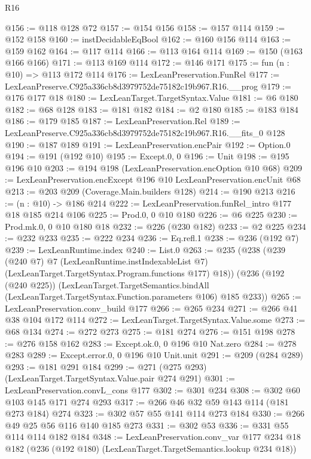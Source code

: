 \begin{lexlean}{R16}
\begin{coremodule}
@156 := @118 @128 @72
@157 := @154 @156
@158 := @157 @114
@159 := @152 @158
@160 := instDecidableEqBool
@162 := @160 @156 @114
@163 := @159 @162
@164 := @117 @114
@166 := @113 @164 @114
@169 := @150 (@163 @166 @166)
@171 := @113 @169 @114
@172 := @146 @171
@175 := fun (n : @10) => @113 @172 @114
@176 := LexLeanPreservation.FunRel
@177 := LexLeanPreserve.C925a336cb8d3979752de75182c19b967.R16.__prog
@179 := @176 @177 @18
@180 := LexLeanTarget.TargetSyntax.Value
@181 := @6 @180
@182 := @68 @128
@183 := @181 @182
@184 := @2 @180
@185 := @183 @184
@186 := @179 @185
@187 := LexLeanPreservation.Rel
@189 := LexLeanPreserve.C925a336cb8d3979752de75182c19b967.R16.__fits_0 @128
@190 := @187 @189
@191 := LexLeanPreservation.encPair
@192 := Option.{0}
@194 := @191 (@192 @10)
@195 := Except.{0, 0}
@196 := Unit
@198 := @195 @196 @10
@203 := @194 @198 (LexLeanPreservation.encOption @10 @68)
@209 := LexLeanPreservation.encExcept @196 @10 LexLeanPreservation.encUnit @68
@213 := @203 @209 (Coverage.Main.builders @128)
@214 := @190 @213
@216 := (n : @10) -> @186 @214
@222 := LexLeanPreservation.funRel_intro @177 @18 @185 @214 @106
@225 := Prod.{0, 0} @10 @180
@226 := @6 @225
@230 := Prod.mk.{0, 0} @10 @180 @18
@232 := @226 (@230 @182)
@233 := @2 @225
@234 := @232 @233
@235 := @222 @234
@236 := Eq.refl.{1}
@238 := @236 (@192 @7)
@239 := LexLeanRuntime.index
@240 := List.{0}
@263 := @235
    (@238
      (@239
        (@240 @7)
        @7
        (LexLeanRuntime.instIndexableList @7)
        (LexLeanTarget.TargetSyntax.Program.functions @177)
        @18))
    (@236
      (@192 (@240 @225))
      (LexLeanTarget.TargetSemantics.bindAll
        (LexLeanTarget.TargetSyntax.Function.parameters @106)
        @185
        @233))
@265 := LexLeanPreservation.conv_build @177
@266 := @265 @234
@271 := @266 @41 @38 @104 @172 @114
@272 := LexLeanTarget.TargetSyntax.Value.some
@273 := @68 @134
@274 := @272 @273
@275 := @181 @274
@276 := @151 @198
@278 := @276 @158 @162
@283 := Except.ok.{0, 0} @196 @10 Nat.zero
@284 := @278 @283
@289 := Except.error.{0, 0} @196 @10 Unit.unit
@291 := @209 (@284 @289)
@293 := @181 @291 @184
@299 := @271 (@275 @293) (LexLeanTarget.TargetSyntax.Value.pair @274 @291)
@301 := LexLeanPreservation.convL_cons @177
@302 := @301 @234
@308 := @302 @60 @103 @145 @171 @274 @293
@317 := @266 @46 @32 @59 @143 @114 (@181 @273 @184) @274
@323 := @302 @57 @55 @141 @114 @273 @184
@330 := @266 @49 @25 @56 @116 @140 @185 @273
@331 := @302 @53
@336 := @331 @55 @114 @114 @182 @184
@348 := LexLeanPreservation.conv_var
    @177
    @234
    @18
    @182
    (@236 (@192 @180) (LexLeanTarget.TargetSemantics.lookup @234 @18))

\end{coremodule}
\end{lexlean}
